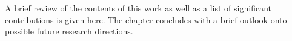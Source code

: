 A brief review of the contents of this work as well as a list of significant contributions is given here.
The chapter concludes with a brief outlook onto possible future research directions.

